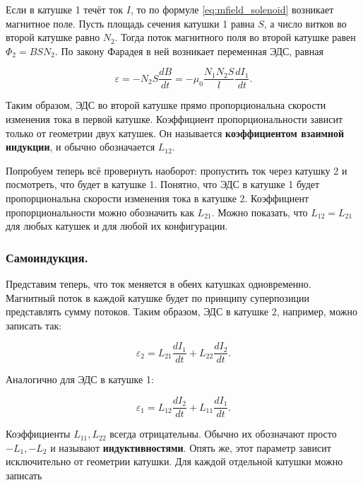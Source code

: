 \documentclass[12pt,a4paper]{article}
\numberwithin{equation}{section}
\numberwithin{equation}{section}
\newcommand{\vareps}{\varepsilon}
\begin{document}
Если в катушке 1 течёт ток $I$, то по формуле
\eqref{eq:mfield_solenoid} возникает магнитное поле. Пусть площадь
сечения катушки 1 равна $S$, а число витков во второй катушке равно
$N_2$. Тогда поток магнитного поля во второй катушке равен $\Phi_2 = B
S N_2$. По закону Фарадея в ней возникает переменная ЭДС, равная

\begin{equation}
  \label{eq:induction_eds}
  \vareps = - N_2 S \frac{dB}{dt} = -\mu_0 \frac{N_1 N_2 S}{l} \frac{dI_1}{dt}.
\end{equation}

Таким образом, ЭДС во второй катушке прямо пропорциональна скорости
изменения тока в первой катушке. Коэффициент пропорциональности
зависит только от геометрии двух катушек. Он называется
\textbf{коэффициентом взаимной индукции}, и обычно обозначается
$L_{12}$.

Попробуем теперь всё провернуть наоборот: пропустить ток через катушку
2 и посмотреть, что будет в катушке 1. Понятно, что ЭДС в катушке 1
будет пропорциональна скорости изменения тока в катушке 2. Коэффициент
пропорциональности можно обозначить как $L_{21}$. Можно показать, что
$L_{12} = L_{21}$ для любых катушек и для любой их конфигурации. 

\subsubsection{Самоиндукция.}
\label{sec:self_induction}

Представим теперь, что ток меняется в обеих катушках
одновременно. Магнитный поток в каждой катушке будет по принципу
суперпозиции представлять сумму потоков. Таким образом, ЭДС в катушке
2, например, можно записать так: 

\begin{equation}
  \label{eq:self_induction_1}
  \vareps_2 = L_{21} \frac{dI_1}{dt} + L_{22} \frac{dI_2}{dt}.
\end{equation}

Аналогично для ЭДС в катушке 1:

\begin{equation}
  \label{eq:self_induction_2}
  \vareps_1 = L_{12} \frac{dI_2}{dt} + L_{11} \frac{dI_1}{dt}.
\end{equation}

Коэффициенты $L_{11},L_{22}$ всегда отрицательны. Обычно их обозначают
просто $-L_1,-L_2$ и называют \textbf{индуктивностями}. Опять же, этот
параметр зависит исключительно от геометрии катушки. Для каждой
отдельной катушки можно записать
\end{document}
